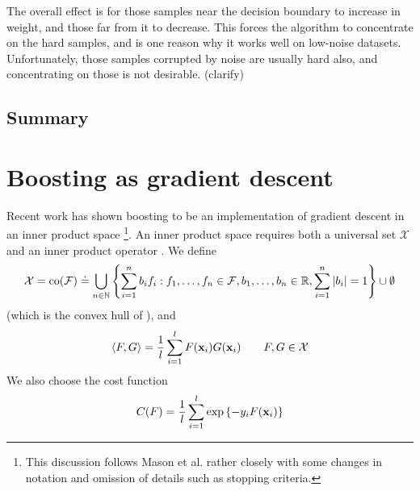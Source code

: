 The overall effect is for those samples near the decision boundary to
increase in weight, and those far from it to decrease.  This forces
the algorithm to concentrate on the hard samples, and is one reason
why it works well on low-noise datasets.  Unfortunately, those samples
corrupted by noise are usually hard also, and concentrating on those
is not desirable. (clarify)

\subsection{Summary}


\section{Boosting as gradient descent}
\label{sec:theory:gradient descent}

Recent work has shown boosting to be an implementation of gradient
descent in an inner product space \cite{Mason99}\footnote{This
discussion follows Mason et al. \cite{Mason99} rather closely with
some changes in notation and omission of details such as stopping
criteria.}.
An inner product space requires both a universal set
$\mathcal{X}$ and an inner product operator \ip{\cdot}{\cdot}.  We
define
%
\begin{equation}
\mathcal{X} = 
\mathrm{co} (\mathcal{F}) \doteq
 \bigcup _{n \in \mathbb{N}}
\left\{
 \sum_{i=1}^{n}
  b_i
f_i : f_1, \ldots, f_n \in \mathcal{F},
 b_1, \ldots, b_n \in \mathbb{R},
 \sum_{i=1}^{n} | b_i | = 1
\right\} \cup \emptyset
\end{equation}
%
(which is the convex hull of \calF), and
%
\begin{equation}
\langle {F} , {G} \rangle = \frac{1}{l} \sum_{i=1}^{l} F(\mathbf{x}_i)G(\mathbf{x}_i) \qquad
F, G \in \mathcal{X}
\end{equation}
%
We also choose the cost function
%
\begin{equation}
C(F) = \frac{1}{l} \sum_{i=1}^{l} \exp
\left\{ -y_i F(\mathbf{x}_i) \right\}
\label{eqn:theory:cost function}
\end{equation}

